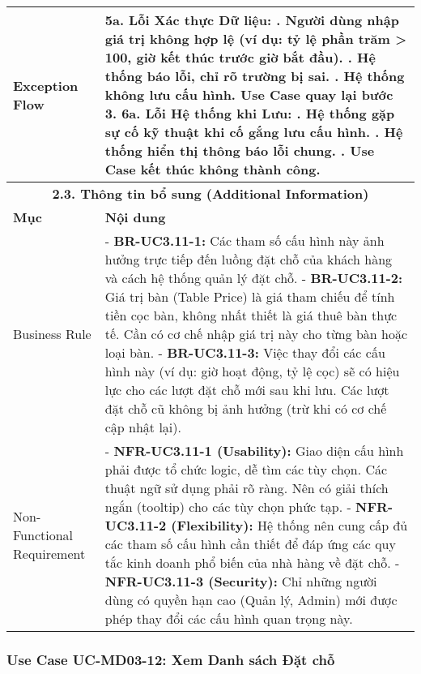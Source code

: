 \begin{longtable}{|m{4cm}|p{11cm}|}
Exception Flow & \textbf{5a. Lỗi Xác thực Dữ liệu:} \newline    1. Người dùng nhập giá trị không hợp lệ (ví dụ: tỷ lệ phần trăm > 100, giờ kết thúc trước giờ bắt đầu). \newline    2. Hệ thống báo lỗi, chỉ rõ trường bị sai. \newline    3. Hệ thống không lưu cấu hình. Use Case quay lại bước 3. \newline \textbf{6a. Lỗi Hệ thống khi Lưu:} \newline    1. Hệ thống gặp sự cố kỹ thuật khi cố gắng lưu cấu hình. \newline    2. Hệ thống hiển thị thông báo lỗi chung. \newline    3. Use Case kết thúc không thành công. \\
\hline
\multicolumn{2}{|c|}{\textbf{2.3. Thông tin bổ sung (Additional Information)}} \\
\hline
\textbf{Mục} & \textbf{Nội dung} \\
\hline
Business Rule & - \textbf{BR-UC3.11-1:} Các tham số cấu hình này ảnh hưởng trực tiếp đến luồng đặt chỗ của khách hàng và cách hệ thống quản lý đặt chỗ. \newline - \textbf{BR-UC3.11-2:} Giá trị bàn (Table Price) là giá tham chiếu để tính tiền cọc bàn, không nhất thiết là giá thuê bàn thực tế. Cần có cơ chế nhập giá trị này cho từng bàn hoặc loại bàn. \newline - \textbf{BR-UC3.11-3:} Việc thay đổi các cấu hình này (ví dụ: giờ hoạt động, tỷ lệ cọc) sẽ có hiệu lực cho các lượt đặt chỗ mới sau khi lưu. Các lượt đặt chỗ cũ không bị ảnh hưởng (trừ khi có cơ chế cập nhật lại). \\
\hline
Non-Functional Requirement & - \textbf{NFR-UC3.11-1 (Usability):} Giao diện cấu hình phải được tổ chức logic, dễ tìm các tùy chọn. Các thuật ngữ sử dụng phải rõ ràng. Nên có giải thích ngắn (tooltip) cho các tùy chọn phức tạp. \newline - \textbf{NFR-UC3.11-2 (Flexibility):} Hệ thống nên cung cấp đủ các tham số cấu hình cần thiết để đáp ứng các quy tắc kinh doanh phổ biến của nhà hàng về đặt chỗ. \newline - \textbf{NFR-UC3.11-3 (Security):} Chỉ những người dùng có quyền hạn cao (Quản lý, Admin) mới được phép thay đổi các cấu hình quan trọng này. \\
\hline
\end{longtable}

\subsubsection{Use Case UC-MD03-12: Xem Danh sách Đặt chỗ}

